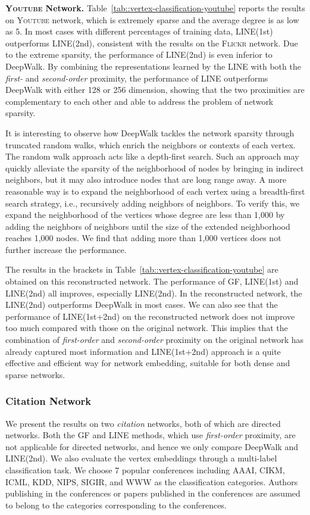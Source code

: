 \documentclass{sig-alternate-2013}
\begin{document}
\noindent \textbf{\textsc{Youtube} Network.}
Table~\ref{tab::vertex-classification-youtube} reports the results on \textsc{Youtube} network, which is extremely sparse and the average degree is as low as 5. In most cases with different percentages of training data,  LINE(1st) outperforms LINE(2nd), consistent with the results on the \textsc{Flickr} network. Due to the extreme sparsity, the performance of LINE(2nd) is even inferior to DeepWalk. By combining the representations learned by the LINE with both the \emph{first-} and \emph{second-order} proximity, the performance of LINE outperforms DeepWalk with either 128 or 256 dimension, showing that the two proximities are complementary to each other and able to address the problem of network sparsity.

It is interesting to observe how DeepWalk tackles the network sparsity through truncated random walks, which enrich the neighbors or contexts of each vertex. The random walk approach acts like a depth-first search. Such an approach may quickly alleviate the sparsity of the neighborhood of nodes by bringing in indirect neighbors, but it may also introduce nodes that are long range away. A more reasonable way is to expand the neighborhood of each vertex using a breadth-first search strategy, i.e., recursively adding neighbors of neighbors. To verify this, we expand the neighborhood of the vertices whose degree are less than 1,000 by adding the neighbors of neighbors until the size of the extended neighborhood reaches 1,000 nodes. We find that adding more than 1,000 vertices does not further increase the performance. 

The results in the brackets in Table~\ref{tab::vertex-classification-youtube} are obtained on this reconstructed network. The performance of GF, LINE(1st) and LINE(2nd) all improves, especially LINE(2nd). In the reconstructed network, the LINE(2nd) outperforms DeepWalk in most cases. We can also see that the performance of LINE(1st+2nd) on the reconstructed network does not improve too much compared with those on the original network. This implies that the combination of \emph{first-order} and \emph{second-order} proximity on the original network has already captured most information and LINE(1st+2nd) approach is a quite effective and efficient way for network embedding, suitable for both dense and sparse networks. 



\subsubsection{Citation Network}
We present the results on two \emph{citation} networks, both of which are directed networks. Both the GF and LINE methods, which use \emph{first-order} proximity, are not applicable for directed networks, and hence we only compare DeepWalk and LINE(2nd). We also evaluate the vertex embeddings through a multi-label classification task. We choose 7 popular conferences including AAAI, CIKM, ICML, KDD, NIPS, SIGIR, and WWW as the classification categories. Authors publishing in the conferences or papers published in the conferences are assumed to belong to the categories corresponding to the conferences. 
\end{document}
